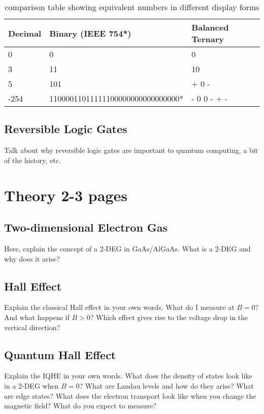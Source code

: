 \documentclass[a4paper]{article}
\begin{document}
\begin{table}
	\centering
	\begin{tabular}{l|l|l} %
		Decimal & Binary (IEEE 754*) & Balanced Ternary \\\hline
		0 & 0 & 0 \\
		3 & 11 & 10 \\
		5 & 101 & + 0 - \\
		-254 & 11000011011111100000000000000000* & - 0 0 - + - \\ %
	\end{tabular}
	\caption{\label{tab:widgets}comparison table showing equivalent numbers in different display forms}
\end{table}


\subsection{Reversible Logic Gates} %
Talk about why reversible logic gates are important to quantum computing, a bit of the history, etc.


\section{Theory 2-3 pages}
\label{sec:theory}

\subsection{Two-dimensional Electron Gas}
Here, explain the concept of a 2-DEG in GaAs/AlGaAs. What is a 2-DEG and why does it arise?

\subsection{Hall Effect}
Explain the classical Hall effect in your own words. What do I measure at $B=0$? And what happens if $B>0$? Which effect gives rise to the voltage drop in the vertical direction?

\subsection{Quantum Hall Effect}
Explain the IQHE in your own words. What does the density of states look like in a 2-DEG when $B=0$? What are Landau levels and how do they arise? What are edge states? What does the electron transport look like when you change the magnetic field? What do you expect to measure?
\end{document}
